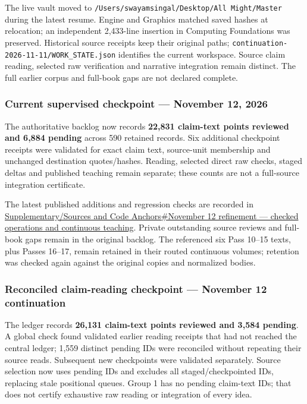 The live vault moved to \texttt{/Users/swayamsingal/Desktop/All\ Might/Master} during the latest resume. Engine and Graphics matched saved hashes at relocation; an independent 2,433-line insertion in Computing Foundations was preserved. Historical source receipts keep their original paths; \texttt{continuation-2026-11-11/WORK\_STATE.json} identifies the current workspace. Source claim reading, selected raw verification and narrative integration remain distinct. The full earlier corpus and full-book gaps are not declared complete.

\subsubsection{Current supervised checkpoint --- November 12, 2026}\label{appendix-3b67654799a2-current-supervised-checkpoint-november-12-2026}

The authoritative backlog now records \textbf{22,831 claim-text points reviewed and 6,884 pending} across 590 retained records. Six additional checkpoint receipts were validated for exact claim text, source-unit membership and unchanged destination quotes/hashes. Reading, selected direct raw checks, staged deltas and published teaching remain separate; these counts are not a full-source integration certificate.

The latest published additions and regression checks are recorded in \hyperref[appendix-a103e7846d21-november-12-refinement-checked-operations-and-continuous-teaching]{Supplementary/Sources and Code Anchors\#November 12 refinement --- checked operations and continuous teaching}. Private outstanding source reviews and full-book gaps remain in the original backlog. The referenced six Pass 10--15 texts, plus Passes 16--17, remain retained in their routed continuous volumes; retention was checked again against the original copies and normalized bodies.

\subsubsection{Reconciled claim-reading checkpoint --- November 12 continuation}\label{appendix-3b67654799a2-reconciled-claim-reading-checkpoint-november-12-continuation}

The ledger records \textbf{26,131 claim-text points reviewed and 3,584 pending}. A global check found validated earlier reading receipts that had not reached the central ledger; 1,559 distinct pending IDs were reconciled without repeating their source reads. Subsequent new checkpoints were validated separately. Source selection now uses pending IDs and excludes all staged/checkpointed IDs, replacing stale positional queues. Group 1 has no pending claim-text IDs; that does not certify exhaustive raw reading or integration of every idea.

